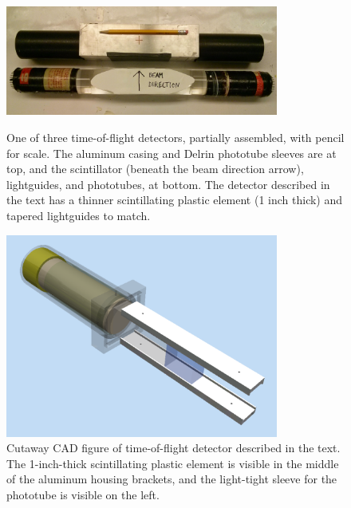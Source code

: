 \begin{figure}[ht]
    \centering
    \includegraphics[width=0.8\textwidth]{figures/Scintillator_disassembled.jpg}
    \caption[Time-of-flight detector partially assembled]
    {One of three time-of-flight detectors, partially assembled, with pencil for scale.
        The aluminum casing and Delrin phototube sleeves are at top, and the
        scintillator (beneath the beam direction arrow), lightguides, and phototubes, at
        bottom. The detector described in the text has a thinner scintillating plastic
    element (1 inch thick) and tapered lightguides to match.}
    \label{TOFDetectorDisassembled}

    \vspace*{\floatsep}

    \centering
    \includegraphics[width=0.8\textwidth]{figures/TimeOfFlightCAD.png}
    \caption[Cutaway CAD figure of time-of-flight detector.]
    {
        Cutaway CAD figure of time-of-flight detector described in the text. The 
        1-inch-thick scintillating plastic element is visible in the middle of the aluminum 
        housing brackets, and the light-tight sleeve for the phototube is visible on
        the left.
    }
    \label{TOFCAD}
\end{figure}

